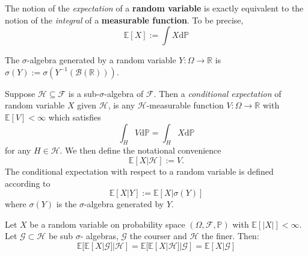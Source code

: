 \begin{definition}[Expectation]
    The notion of the \emph{expectation} of a \textbf{random variable} is exactly equivalent
    to the notion of the \emph{integral} of a \textbf{measurable function}.
    To be precise,
    \begin{equation*}
        \mathbb{E}[X]:=\int X\mathrm d\mathbb{P}
    \end{equation*}
\end{definition}

\begin{definition}
    The $\sigma$-algebra generated by a random variable $Y:\Omega\rightarrow\mathbb{R}$
    is $\sigma(Y):=\sigma(Y^{-1}(\mathcal{B}(\mathbb{R})))$.
\end{definition}

\begin{definition}
    Suppose $\mathcal{H}\subseteq\mathcal{F}$ is a sub-$\sigma$-algebra
    of $\mathcal{F}.$ Then a \emph{conditional expectation} of random variable
    $X$ given $\mathcal{H}$, is any $\mathcal{H}$-measurable function 
    $V:\Omega\rightarrow\mathbb{R}$ with $\mathbb{E}[V]<\infty$ which satisfies
    \begin{equation*}
        \int_H V\mathrm d\mathbb{P}=\int_H X\mathrm d\mathbb{P}
    \end{equation*}
    for any $H\in\mathcal{H}$. We then define the notational convenience
    \begin{equation*}
        \mathbb{E}[X|\mathcal{H}]:=V.
    \end{equation*}
    The conditional expectation with respect to a random variable is defined according
    to
    \begin{equation*}
        \mathbb{E}[X|Y]:=\mathbb{E}[X|\sigma(Y)]
    \end{equation*}
    where $\sigma(Y)$ is the $\sigma$-algebra generated by $Y$.
\end{definition}

\begin{theorem}
    Let $X$ be a random variable on probability space $(\Omega,\mathcal{F},\mathbb{P})$
    with $\mathbb{E}[|X|]<\infty$. Let $\mathcal{G}\subset\mathcal{H}$ be sub $\sigma$-
    algebras, $\mathcal{G}$ the courser and $\mathcal{H}$ the finer. Then:
    \begin{equation*}
        \mathbb{E}[\mathbb{E}[X|\mathcal{G}]|\mathcal{H}]=\mathbb{E}[\mathbb{E}[X|\mathcal{H}]|\mathcal{G}]=\mathbb{E}[X|\mathcal{G}]
    \end{equation*}
\end{theorem}

